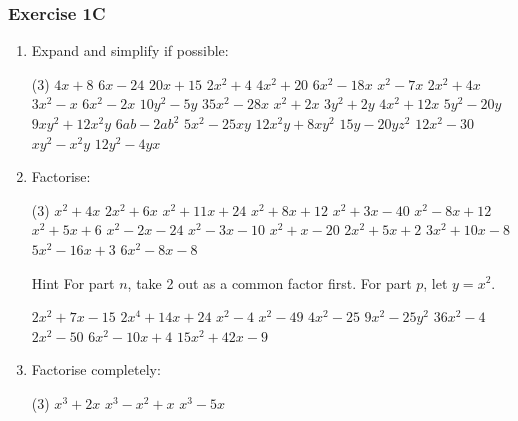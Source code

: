 \documentclass[fleqn]{article}
\newcounter{taskscounter}
\newcommand\getcurrentref[1]{%
 \ifnumequal{\value{#1}}{0}
  {??}
  {\the\value{#1}}%
}
\newcommand{\exercise}{\subsubsection}
\begin{document}
\exercise{Exercise 1C}
\begin{enumerate}
	\item Expand and simplify if possible:
		\begin{tasks}(3) %
		  	\task $4x+8$			%
		  	\task $6x-24$		%
		  	\task $20x+15$		%
		  	\task $2x^2+4$		%
		  	\task $4x^2+20$		%
		  	\task $6x^2-18x$		%
		  	\task $x^2-7x$		%
		  	\task $2x^2+4x$		%
		  	\task $3x^2-x$		%
		  	\task $6x^2-2x$		%
		  	\task $10y^2-5y$		%
		  	\task $35x^2-28x$	%
		  	\task $x^2+2x$		%
		  	\task $3y^2+2y$		%
		  	\task $4x^2+12x$		%
		  	\task $5y^2-20y$		%
		  	\task $9xy^2+12x^2y$	%
		  	\task $6ab-2ab^2$	%
		  	\task $5x^2-25xy$	%
		  	\task $12x^2y+8xy^2$	%
		  	\task $15y-20yz^2$	%
		  	\task $12x^2-30$		%
		  	\task $xy^2-x^2y$	%
		  	\task $12y^2-4yx$	%
		\end{tasks}
		\newpage
	\item Factorise:
		\begin{tasks}(3) %
			\task $x^2+4x$			%
			\task $2x^2+6x$			%
			\task $x^2+11x+24$		%
			\task $x^2+8x+12$		%
			\task $x^2+3x-40$		%
			\task $x^2-8x+12$		%
			\task $x^2+5x+6$			%
			\task $x^2-2x-24$		%
			\task $x^2-3x-10$		%
			\task $x^2+x-20$			%
			\task $2x^2+5x+2$		%
			\task $3x^2+10x-8$		%
			\task $5x^2-16x+3$		%
			\task $6x^2-8x-8$ 		%
			\task[]
				\hspace*{-2.25cm}
				\begin{minipage}[t][][c]{0.42\textwidth}
				\vspace{-0.4cm}
				\begin{note*}{Hint}{}
 					For part $n$, take 2 out as a common factor first. For part $p$, let $y=x^2$.
 				\end{note*}
				\setcounter{taskscounter}{\getcurrentref{taskscounter}-1}
				\end{minipage}
				\vspace{-200cm}
			\task $2x^2+7x-15$		%
			\task* $2x^4+14x+24$		%
			\task $x^2-4$			%
			\task* $x^2-49$			%
			\task $4x^2-25$			%
			\task $9x^2-25y^2$		%
			\task $36x^2-4$			%
			\task $2x^2-50$			%
			\task $6x^2-10x+4$		%
			\task $15x^2+42x-9$		%
		\end{tasks}	
	\item Factorise completely:
		\begin{tasks}(3) %
			\task $x^3+2x$			%
			\task $x^3-x^2+x$		%
			\task $x^3-5x$			%

\end{tasks}
\end{enumerate}
\end{document}
